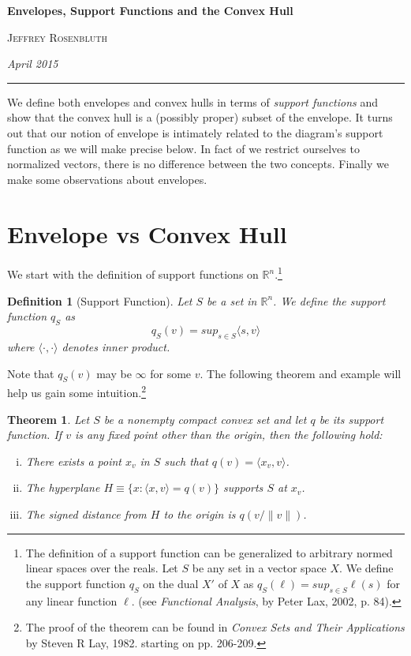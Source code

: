 \documentclass[11pt]{amsart}
\newtheorem{defn}{Definition}
\newtheorem{thm}{Theorem}
\begin{document}
\begin{center}
\bigskip 
\textbf{Envelopes, Support Functions and the Convex Hull}

\textsc{Jeffrey Rosenbluth}

\textit{April 2015}
\end{center}
\hrule
\vspace{0.25in}

We define both envelopes and convex hulls in terms of \emph{support functions} and show
that the convex hull is a (possibly proper) subset of the envelope. It turns out that our notion of
envelope is intimately related to the diagram's support function as we will make precise below.
In fact of we restrict ourselves to normalized vectors, there is no difference between the two concepts.
Finally we make some observations about envelopes. 

\section{Envelope vs Convex Hull}

We start with the definition of support functions
on  $\mathbb{R}^n$.\footnote{
The definition of a support function can be generalized to arbitrary normed linear spaces over the reals.
Let $S$ be any set in a vector space $X$. We define the support function $q_S$ on the dual $X'$ of $X$ as 
$q_S(\ell) = sup_{s \in S} \ell(s)$
for any linear function $\ell.$ 
(see \emph{Functional Analysis}, by Peter Lax, 2002, p. 84).
}
\begin{defn}[Support Function]
\label{supportfunc}
Let $S$ be a set in $\mathbb{R}^n$. We define the support function $q_S$ as 
$$q_S(v) = sup_{s \in S} \langle s,v \rangle$$
where $\langle \cdot, \cdot \rangle$ denotes inner product.
\end{defn}

Note that $q_S(v)$ may be $\infty$ for some $v$. The following theorem
and example will help us gain some intuition.\footnote{The proof of the theorem can
be found in \emph{Convex Sets and Their Applications} by Steven R Lay, 1982. starting on pp. 206-209.} 

\begin{thm}
Let $S$ be a nonempty compact convex set and let $q$ be its support function. If $v$ is any fixed point other
than the origin, then the following hold:
\begin{enumerate}[i.]
\item There exists a point $x_v$ in $S$ such that $q(v)=\langle x_v, v \rangle$.
\item The hyperplane $H \equiv \{x : \langle x, v \rangle = q(v)\}$ supports $S$ at $x_v$.
\item The signed distance from $H$ to the origin is $q(v/\|v\|)$.
\end{enumerate}
\end{thm}
\end{document}
